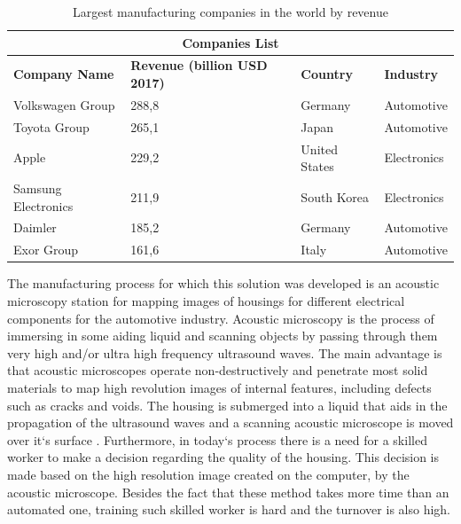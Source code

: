 \documentclass[12pt,a4paper,twoside]{report}
\begin{document}
\begin{table}[t]
\centering
\begin{tabular}{ |p{3cm}||p{3cm}|p{3cm}|p{3cm}|  }
 \hline
 \multicolumn{4}{|c|}{\textbf{Companies List}} \\
 \hline
 \textbf{Company Name} & \textbf{Revenue (billion USD 2017)} & \textbf{Country} & \textbf{Industry}\\
 \hline
 Volkswagen Group & 288,8 & Germany & Automotive\\
 \hline
 Toyota Group & 265,1 & Japan & Automotive \\
 \hline
 Apple & 229,2 & United States & Electronics\\
 \hline
 Samsung Electronics & 211,9 & South Korea & Electronics \\
 \hline
 Daimler & 185,2 & Germany & Automotive\\
 \hline
 Exor Group & 161,6 & Italy & Automotive\\
 \hline
\end{tabular}
\caption{Largest manufacturing companies in the world by revenue}
\end{table}
\par
 
The manufacturing process for which this solution was developed is an acoustic microscopy station for mapping images of housings for different electrical components for the automotive industry. Acoustic microscopy is the process of immersing in some aiding liquid and scanning objects by passing through them very high and/or ultra high frequency ultrasound waves. The main advantage is that acoustic microscopes operate non-destructively and penetrate most solid materials to map high revolution images of internal features, including defects such as cracks and voids. The housing is submerged into a liquid that aids in the propagation of the ultrasound waves and a scanning acoustic microscope is moved over it`s surface \cite{article-acusticmicro1}\cite{article-acusticmicro2}\cite{article-acusticmicro3}. Furthermore, in today`s process there is a need for a skilled worker to make a decision regarding the quality of the housing. This decision is made based on the high resolution image created on the computer, by the acoustic microscope. Besides the fact that these method takes more time than an automated one, training such skilled worker is hard and the turnover is also high. \par
\end{document}
